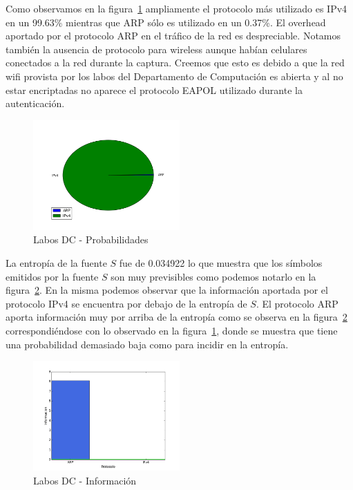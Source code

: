 \documentclass[final,inline,narroweqnarray,a4paper]{ieee}
\begin{document}
Como observamos en la figura~\ref{torta:labosDcS} ampliamente el protocolo más utilizado es IPv4 en un 99.63\% mientras que ARP sólo es utilizado en un 0.37\%. 
El overhead aportado por el protocolo ARP en el tráfico de la red es despreciable.
Notamos también la ausencia de protocolo para wireless aunque habían celulares conectados a la red durante la captura. Creemos que esto es debido a que la red wifi provista por los labos del Departamento de Computación es abierta y al no estar encriptadas no aparece el protocolo EAPOL utilizado durante la autenticación. 

\begin{figure}[H]
    \begin{center}
        \includegraphics[width=0.5\textwidth]{plot/laboDcS-pie.png}
        \caption{Labos DC - Probabilidades}
        \label{torta:labosDcS}
    \end{center}
\end{figure}

La entropía de la fuente $S$ fue de 0.034922 lo que muestra que los símbolos emitidos por la fuente $S$ son muy previsibles como podemos notarlo en la figura~\ref{histo:laboDcS}. En la misma podemos observar que la información aportada por el protocolo IPv4 se encuentra por debajo de la entropía de $S$. El protocolo ARP aporta información muy por arriba de la entropía como se observa en la figura~\ref{histo:laboDcS} correspondiéndose con lo observado en la figura~\ref{torta:labosDcS}, donde se muestra que tiene una probabilidad demasiado baja como para incidir en la entropía.

\begin{figure}[H]
    \begin{center}
        \includegraphics[width=0.5\textwidth]{plot/laboDcS-bar.png}
        \caption{Labos DC - Información}
        \label{histo:laboDcS}
    \end{center}
\end{figure}
\end{document}
